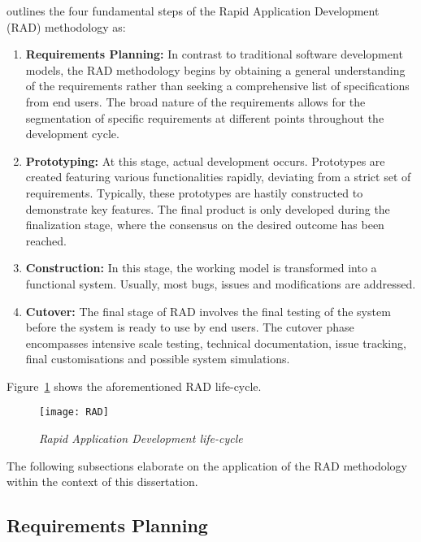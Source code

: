 \citet*{van2008software} outlines the four fundamental steps of the Rapid Application Development (RAD) methodology as:

\begin{enumerate}
\item \textbf{Requirements Planning:} In contrast to traditional software development models, the RAD methodology begins by obtaining a general understanding of the requirements rather than seeking a comprehensive list of specifications from end users.  The broad nature of the requirements allows for the segmentation of specific requirements at different points throughout the development cycle.

\item \textbf{Prototyping:} At this stage, actual development occurs.  Prototypes are created featuring various functionalities rapidly, deviating from a strict set of requirements.  Typically, these prototypes are hastily constructed to demonstrate key features.  The final product is only developed during the finalization stage, where the consensus on the desired outcome has been reached.

\item \textbf{Construction:}  In this stage, the working model is transformed into a functional system.  Usually, most bugs, issues and modifications are addressed.

\item \textbf{Cutover:} The final stage of RAD involves the final testing of the system before the system is ready to use by end users.  The cutover phase encompasses intensive scale testing, technical documentation, issue tracking, final customisations and possible system simulations.
\end{enumerate}

Figure~\ref{fig:rad-lifecycle} shows the aforementioned RAD life-cycle.

\begin{figure}[H]
  \centering
  \texttt{[image: RAD]}
  \caption{\textit{Rapid Application Development life-cycle}}\label{fig:rad-lifecycle}
  \centering
\end{figure}

The following subsections elaborate on the application of the RAD methodology within the context of this dissertation.

\subsection{Requirements Planning}

